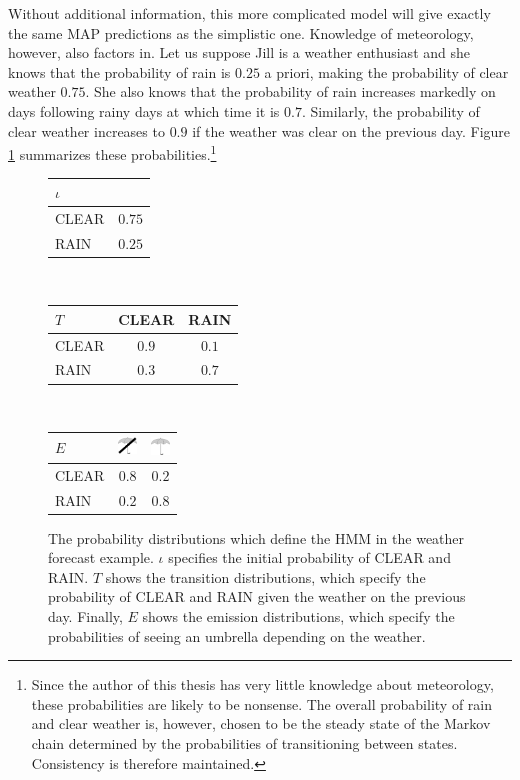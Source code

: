 Without additional information, this more complicated model will give
exactly the same MAP predictions as the simplistic one. Knowledge of
meteorology, however, also factors in. Let us suppose Jill is a
weather enthusiast and she knows that the probability of rain is
$0.25$ a priori, making the probability of clear weather $0.75$. She also knows
that the probability of rain increases markedly on days following
rainy days at which time it is $0.7$.  Similarly, the probability of
clear weather increases to $0.9$ if the weather was clear on the
previous day. Figure \ref{hmm-ex-1} summarizes these
probabilities.\footnote{Since the author of this thesis has very
  little knowledge about meteorology, these probabilities are likely
  to be nonsense. The overall probability of rain and clear weather
  is, however, chosen to be the steady state of the Markov chain
  determined by the probabilities of transitioning between
  states. Consistency is therefore maintained.}

\begin{figure}[!htb]
\begin{center}
\begin{tabular}{|l|c|}
\hline
   $\iota$   &       \\
\hline
CLEAR  & $0.75$ \\
RAIN  & $0.25$ \\
\hline
\end{tabular}~~~
\begin{tabular}{|l|cc|}
\hline
   $T$   & CLEAR & RAIN  \\
\hline
CLEAR  & $0.9$ & $0.1$ \\
RAIN   & $0.3$ & $0.7$ \\
\hline
\end{tabular}~~~
\begin{tabular}{|l|cc|}
\hline
   $E$   & \includegraphics[width=0.5cm]{no_umbrella} & \includegraphics[width=0.5cm]{umbrella} \\
\hline
CLEAR   & $0.8$ &  $0.2$         \\
RAIN    & $0.2$ &  $0.8$         \\
\hline
\end{tabular}
\end{center}
\caption{The probability distributions which define the HMM in the
  weather forecast example. $\iota$ specifies the initial probability
  of CLEAR and RAIN. $T$ shows the transition distributions, which
  specify the probability of CLEAR and RAIN given the weather on the
  previous day. Finally, $E$ shows the emission distributions, which
  specify the probabilities of seeing an umbrella depending on the
  weather.}\label{hmm-ex-1}
\end{figure}

